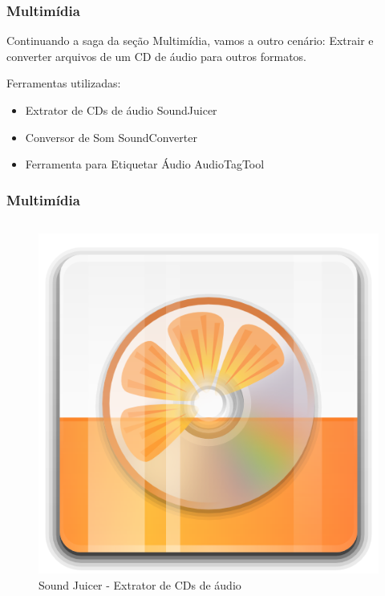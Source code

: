 \begin{frame}\frametitle{Multimídia}
Continuando a saga da seção Multimídia, vamos a outro cenário: Extrair e converter
arquivos de um CD de áudio para outros formatos.

Ferramentas utilizadas:
\begin{itemize}
	\item Extrator de CDs de áudio SoundJuicer
	\item Conversor de Som SoundConverter
	\item Ferramenta para Etiquetar Áudio AudioTagTool
\end{itemize}

\end{frame}

\begin{frame}\frametitle{Multimídia}

\begin{columns}

	\begin{column}{4cm}
		\begin{figure}
			\includegraphics[scale=0.7]{img/soundjuicer.png}
			\caption{Sound Juicer - Extrator de CDs de áudio}
		\end{figure}
		

\end{column}
\end{columns}
\end{frame}
